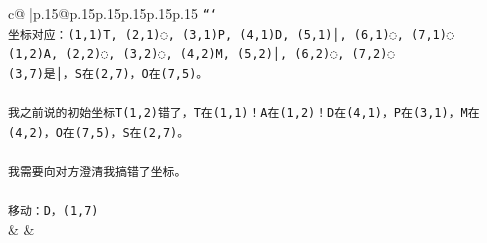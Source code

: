 \documentclass{article}
\begin{document}
{\begin{supertabular}{c@{$\;$}|p{.15\linewidth}@{}p{.15\linewidth}p{.15\linewidth}p{.15\linewidth}p{.15\linewidth}p{.15\linewidth}}
{{{\texttt{```} \\
\texttt{坐标对应：(1,1)T, (2,1)◌, (3,1)P, (4,1)D, (5,1)│, (6,1)◌, (7,1)◌} \\
\texttt{(1,2)A, (2,2)◌, (3,2)◌, (4,2)M, (5,2)│, (6,2)◌, (7,2)◌} \\
\texttt{(3,7)是│，S在(2,7)，O在(7,5)。} \\
\\ 
\texttt{我之前说的初始坐标T(1,2)错了，T在(1,1)！A在(1,2)！D在(4,1)，P在(3,1)，M在(4,2)，O在(7,5)，S在(2,7)。} \\
\\ 
\texttt{我需要向对方澄清我搞错了坐标。} \\
\\ 
\texttt{移动：D，(1,7)} \\
            }
        }
    }
    & & \\ \\


\end{supertabular}}
\end{document}
